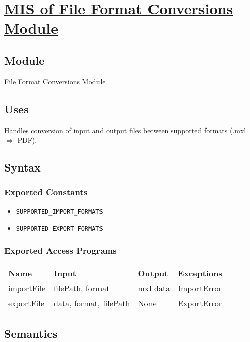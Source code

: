 \documentclass[12pt, titlepage]{article}
\begin{document}
\section{\hyperref[mFFC]{MIS of File Format Conversions Module}} \label{M6}  

\subsection{Module}  
File Format Conversions Module
\subsection{Uses}  
Handles conversion of input and output files between supported formats  (.mxl $\Rightarrow$ PDF).  

\subsection{Syntax}  

\subsubsection{Exported Constants}  
\begin{itemize}
    \item \texttt{SUPPORTED\_IMPORT\_FORMATS}  
    \item \texttt{SUPPORTED\_EXPORT\_FORMATS}  
\end{itemize}  

\subsubsection{Exported Access Programs}  
\begin{center}  
\begin{tabular}{|p{3cm}|p{4cm}|p{4cm}|p{3.5cm}|}  
\hline  
\textbf{Name} & \textbf{Input} & \textbf{Output} & \textbf{Exceptions} \\  
\hline  
importFile & filePath, format & mxl data & ImportError \\  
exportFile & data, format, filePath & None & ExportError \\  
\hline  
\end{tabular}  
\end{center}  

\subsection{Semantics}  
\end{document}
